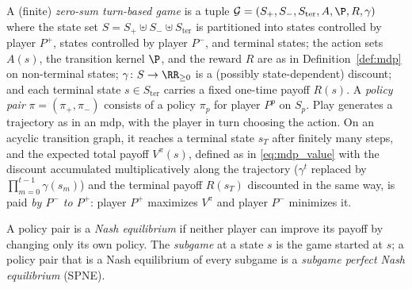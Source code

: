 \begin{definition}\label{def:turn_based_game}
A (finite) \emph{zero-sum turn-based game} is a tuple $\mathcal{G} = (S_{+}, S_{-}, S_{\mathrm{ter}}, A, \P, R, \gamma)$ where the state set $S = S_{+} \uplus S_{-} \uplus S_{\mathrm{ter}}$ is partitioned into states controlled by player $P^{+}$, states controlled by player $P^{-}$, and terminal states; the action sets $A(s)$, the transition kernel $\P$, and the reward $R$ are as in Definition~\ref{def:mdp} on non-terminal states; $\gamma \colon S \to \RR_{\ge 0}$ is a (possibly state-dependent) discount; and each terminal state $s \in S_{\mathrm{ter}}$ carries a fixed one-time payoff $R(s)$. A \emph{policy pair} $\pi = (\pi_{+}, \pi_{-})$ consists of a policy $\pi_{p}$ for player $P^{p}$ on $S_{p}$. Play generates a trajectory as in an \ac{mdp}, with the player in turn choosing the action. On an acyclic transition graph, it reaches a terminal state $s_T$ after finitely many steps, and the expected total payoff $V^{\pi}(s)$, defined as in \eqref{eq:mdp_value} with the discount accumulated multiplicatively along the trajectory ($\gamma^t$ replaced by $\prod_{m=0}^{t-1}\gamma(s_m)$) and the terminal payoff $R(s_T)$ discounted in the same way, is paid \emph{by $P^{-}$ to $P^{+}$}: player $P^{+}$ maximizes $V^{\pi}$ and player $P^{-}$ minimizes it.
\end{definition}

A policy pair is a \emph{Nash equilibrium} if neither player can improve its payoff by changing only its own policy. The \emph{subgame} at a state $s$ is the game started at $s$; a policy pair that is a Nash equilibrium of every subgame is a \emph{subgame perfect Nash equilibrium} (SPNE).

